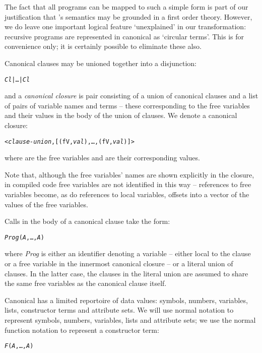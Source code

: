The fact that all \go programs can be mapped to such a simple form is part of our justification that \go's semantics may be grounded in a first order theory. However, we do leave one important logical feature `unexplained' in our transformation: recursive programs are represented in canonical \go as `circular terms'. This is for convenience only; it is certainly possible to eliminate these also.

Canonical \go clauses may be unioned together into a disjunction:
\begin{alltt}
\emph{Cl} | \ldots | \emph{Cl\subn}
\end{alltt}
and a \go \emph{canonical closure} is pair consisting of a union of canonical clauses and a list of pairs of variable names and terms -- these corresponding to the free variables and their values in the body of the union of clauses. We denote a canonical closure:
\begin{alltt}
< \emph{clause-union}, [ (fV,\emph{val}),\ldots,(fV\subn,\emph{val\subn})]>
\end{alltt}
where  are the free variables and  are their corresponding values.

Note that, although the free variables' names are shown explicitly in the closure, in compiled code free variables are not identified in this way -- references to free variables become, as do references to local variables, offsets into a vector of the values of the free variables.

Calls in the body of a canonical clause take the form:
\begin{alltt}
\emph{Prog}(\emph{A},\ldots,\emph{A\subn})
\end{alltt}
where \emph{Prog} is either an identifier denoting a variable -- either local to the clause or a free variable in the innermost canonical closure -- or a literal union of clauses. In the latter case, the clauses in the literal union are assumed to share the same free variables as the canonical clause itself.

Canonical \go has a limited reportoire of data values: symbols, numbers, variables, lists, constructor terms and attribute sets. We will use normal \go notation to represent symbols, numbers, variables, lists and attribute sets; we use the normal function notation to represent a constructor term:
\begin{alltt}
\emph{F}(\emph{A},\ldots,\emph{A\subn})
\end{alltt}

